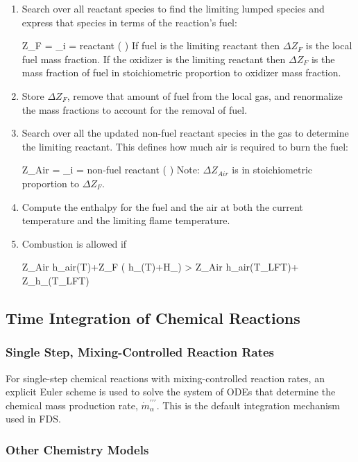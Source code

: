 \begin{enumerate}
\item Search over all reactant species to find the limiting lumped species and express that species in terms of the reaction's fuel:

\be \Delta Z_F = \min_{i \; = \; reactant} \left( \right) \ee
If fuel is the limiting reactant then $\Delta Z_F$ is the local fuel mass fraction. If the oxidizer is the limiting reactant then $\Delta Z_F$ is the mass fraction of fuel in stoichiometric proportion to oxidizer mass fraction.
\item Store $\Delta Z_F$, remove that amount of fuel from the local gas, and renormalize the mass fractions to account for the removal of fuel.
\item Search over all the updated non-fuel reactant species in the gas to determine the limiting reactant.  This defines how much air is required to burn the fuel:

\be \Delta Z_{Air} = \min_{i \; = \; non-fuel \; reactant} \left( \right) \ee
Note: $\Delta Z_{Air}$ is in stoichiometric proportion to $\Delta Z_{F}$.
\item Compute the enthalpy for the fuel and the air at both the current temperature and the limiting flame temperature.
\item Combustion is allowed if 

\be \Delta Z_{Air} h_{air}(T)+\Delta Z_F \left( h_\F(T)+\Delta H_\F \right) > \Delta Z_{Air} h_{air}(T_{LFT})+ \Delta Z_\F h_\F(T_{LFT}) \ee

\end{enumerate}

\subsection{Time Integration of Chemical Reactions}

\subsubsection{Single Step, Mixing-Controlled Reaction Rates}
For single-step chemical reactions with mixing-controlled reaction rates, an explicit Euler scheme is used to solve the system of ODEs that determine the chemical mass production rate, $\dot{m}^{\prime\prime\prime}_{\alpha}$. This is the default integration mechanism used in FDS.

\subsubsection{Other Chemistry Models}

